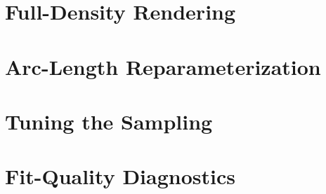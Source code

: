 \section{Full-Density Rendering}
\label{sec:ew-fulldensity}

\section{Arc-Length Reparameterization}
\label{sec:ew-arclength}

\section{Tuning the Sampling}
\label{sec:ew-tuning}

\section{Fit-Quality Diagnostics}
\label{sec:ew-diagnostics}
